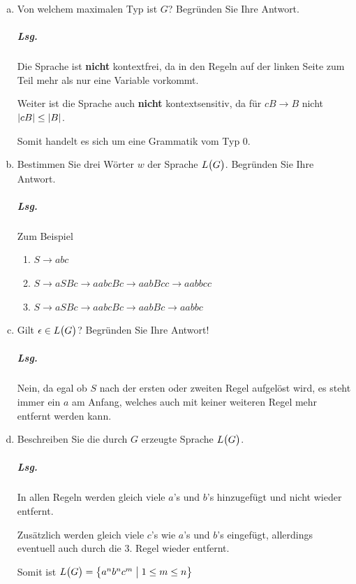\documentclass{scrreprt}
\begin{document}
\begin{enumerate}[(a)]
\item Von welchem maximalen Typ ist $G$?
  Begründen Sie Ihre Antwort.

  \subparagraph{Lsg.} Die Sprache ist \textbf{nicht} kontextfrei, da in den
  Regeln auf der linken Seite zum Teil mehr als nur eine Variable vorkommt.

  Weiter ist die Sprache auch \textbf{nicht} kontextsensitiv, da für
  $cB \to B$ nicht $\abs{cB} \le \abs{B}$.

  Somit handelt es sich um eine Grammatik vom Typ 0.

\item Bestimmen Sie drei Wörter $w$ der Sprache $L\qty\big(G)$.
  Begründen Sie Ihre Antwort.

  \subparagraph{Lsg.} Zum Beispiel
  \begin{enumerate}[1)]
  \item $S \to abc$
  \item $S \to aSBc \to aabcBc \to aabBcc \to aabbcc$
  \item $S \to aSBc \to aabcBc \to aabBc \to aabbc$
  \end{enumerate}

\newpage
\item Gilt $\epsilon \in L\qty\big(G)$?
  Begründen Sie Ihre Antwort!

  \subparagraph{Lsg.} Nein, da egal ob $S$ nach der ersten oder
  zweiten Regel aufgelöst wird, es steht immer ein $a$ am Anfang, welches auch
  mit keiner weiteren Regel mehr entfernt werden kann.

\item Beschreiben Sie die durch $G$ erzeugte Sprache $L\qty\big(G)$.

  \subparagraph{Lsg.} In allen Regeln werden gleich viele $a$'s und $b$'s
  hinzugefügt und nicht wieder entfernt.

  Zusätzlich werden gleich viele $c$'s wie $a$'s und $b$'s eingefügt, allerdings
  eventuell auch durch die 3. Regel wieder entfernt.

  Somit ist $L\qty\big(G) = \qty{a^nb^nc^m \;{\big |}\; 1 \leq m \leq n}$
\end{enumerate}
\end{document}
